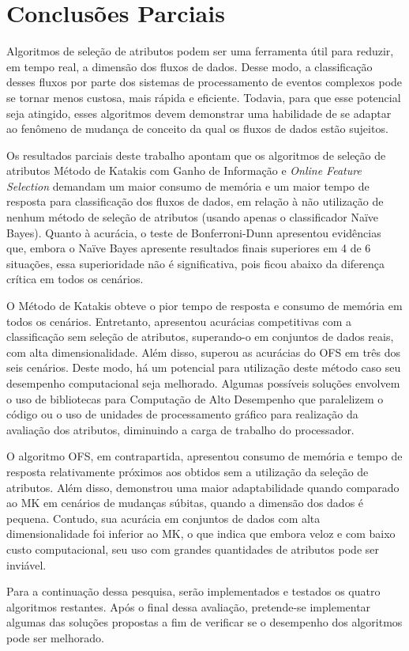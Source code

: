\chapter{Conclusões Parciais}\label{chp:conclusoes}

Algoritmos de seleção de atributos podem ser uma ferramenta útil para reduzir, em tempo real, a dimensão dos fluxos de dados. Desse modo, a classificação desses fluxos por parte dos sistemas de processamento de eventos complexos pode se tornar menos custosa, mais rápida e eficiente. Todavia, para que esse potencial seja atingido, esses algoritmos devem demonstrar uma habilidade de se adaptar ao fenômeno de mudança de conceito da qual os fluxos de dados estão sujeitos.

Os resultados parciais deste trabalho apontam que os algoritmos de seleção de atributos Método de Katakis com Ganho de Informação e \textit{Online Feature Selection} demandam um maior consumo de memória e um maior tempo de resposta para classificação dos fluxos de dados, em relação à não utilização de nenhum método de seleção de atributos (usando apenas o classificador Naïve Bayes). Quanto à acurácia, o teste de Bonferroni-Dunn apresentou evidências que, embora o Naïve Bayes apresente resultados finais superiores em 4 de 6 situações, essa superioridade não é significativa, pois ficou abaixo da diferença crítica em todos os cenários.

O Método de Katakis obteve o pior tempo de resposta e consumo de memória em todos os cenários. Entretanto, apresentou acurácias competitivas com a classificação sem seleção de atributos, superando-o em conjuntos de dados reais, com alta dimensionalidade. Além disso, superou as acurácias do OFS em três dos seis cenários. Deste modo, há um potencial para utilização deste método caso seu desempenho computacional seja melhorado. Algumas possíveis soluções envolvem o uso de bibliotecas para Computação de Alto Desempenho que paralelizem o código ou o uso de unidades de processamento gráfico para realização da avaliação dos atributos, diminuindo a carga de trabalho do processador.

O algoritmo OFS, em contrapartida, apresentou consumo de memória e tempo de resposta relativamente próximos aos obtidos sem a utilização da seleção de atributos. Além disso, demonstrou uma maior adaptabilidade quando comparado ao MK em cenários de mudanças súbitas, quando a dimensão dos dados é pequena. Contudo, sua acurácia em conjuntos de dados com alta dimensionalidade foi inferior ao MK, o que indica que embora veloz e com baixo custo computacional, seu uso com grandes quantidades de atributos pode ser inviável.

Para a continuação dessa pesquisa, serão implementados e testados os quatro algoritmos restantes. Após o final dessa avaliação, pretende-se implementar algumas das soluções propostas a fim de verificar se o desempenho dos algoritmos pode ser melhorado. 
